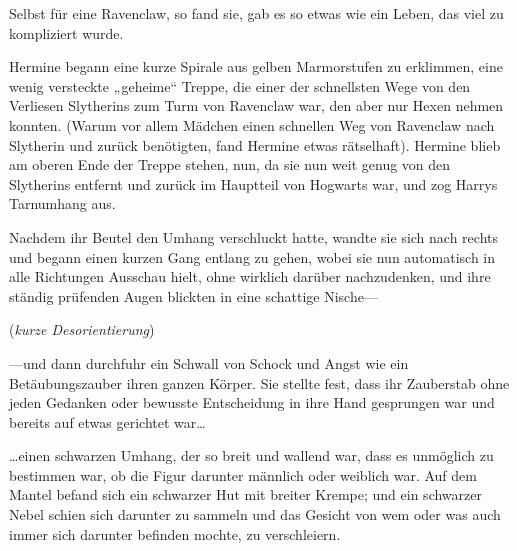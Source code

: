 Selbst für eine Ravenclaw, so fand sie, gab es so etwas wie ein Leben, das viel zu kompliziert wurde.

Hermine begann eine kurze Spirale aus gelben Marmorstufen zu erklimmen, eine wenig versteckte „geheime“ Treppe, die einer der schnellsten Wege von den Verliesen Slytherins zum Turm von Ravenclaw war, den aber nur Hexen nehmen konnten. (Warum vor allem Mädchen einen schnellen Weg von Ravenclaw nach Slytherin und zurück benötigten, fand Hermine etwas rätselhaft). Hermine blieb am oberen Ende der Treppe stehen, nun, da sie nun weit genug von den Slytherins entfernt und zurück im Hauptteil von Hogwarts war, und zog Harrys Tarnumhang aus.

Nachdem ihr Beutel den Umhang verschluckt hatte, wandte sie sich nach rechts und begann einen kurzen Gang entlang zu gehen, wobei sie nun automatisch in alle Richtungen Ausschau hielt, ohne wirklich darüber nachzudenken, und ihre ständig prüfenden Augen blickten in eine schattige Nische—

(\emph{kurze Desorientierung})

—und dann durchfuhr ein Schwall von Schock und Angst wie ein Betäubungszauber ihren ganzen Körper. Sie stellte fest, dass ihr Zauberstab ohne jeden Gedanken oder bewusste Entscheidung in ihre Hand gesprungen war und bereits auf etwas gerichtet war…

…einen schwarzen Umhang, der so breit und wallend war, dass es unmöglich zu bestimmen war, ob die Figur darunter männlich oder weiblich war. Auf dem Mantel befand sich ein schwarzer Hut mit breiter Krempe; und ein schwarzer Nebel schien sich darunter zu sammeln und das Gesicht von wem oder was auch immer sich darunter befinden mochte, zu verschleiern.

